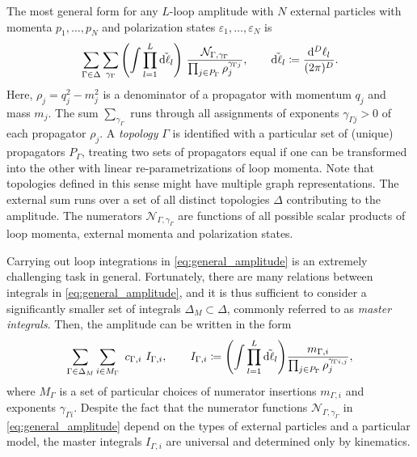 The most general form for any $L$-loop amplitude with $N$ external particles with momenta $p_1,\ldots,p_N$ and polarization states $\varepsilon_1,\ldots,\varepsilon_N$ is
\begin{equation}
  \sum_{\Gamma \in \Delta} \sum_{\gamma_\Gamma} \qty(\int \prod_{l=1}^{L} \tilde{\dd{\ell_l}}) ~ 
  \frac{\mathcal{N}_{\Gamma,\gamma_\Gamma}%
    }{\prod_{j\in P_\Gamma} \rho_j^{\gamma_{\Gamma j}}},
    \qquad \tilde{\dd{\ell_l}} \coloneqq \frac{\dd[D]{\ell_l}}{(2\pi)^{D}}.
  \label{eq:general_amplitude}
\end{equation}
Here, $\rho_j = q_j^2 - m_j^2$ is a denominator of a propagator with momentum $q_j$ and mass $m_j$. The sum $\sum_{\gamma_\Gamma}$ runs through all assignments
of exponents $\gamma_{\Gamma j} > 0$ of each propagator $\rho_j$. 
A \emph{topology} $\Gamma$ is identified with a particular set of (unique) propagators $P_\Gamma$,
treating two sets of propagators equal if one can be transformed into the other with linear re-parametrizations of loop momenta.
Note that topologies defined in this sense might have multiple graph representations.
The external sum runs over a set of all distinct topologies $\Delta$ contributing to the amplitude.
The numerators $\mathcal{N}_{\Gamma,\gamma_\Gamma}$
are functions of all possible scalar products of loop momenta, external momenta and polarization states.

Carrying out loop integrations in \cref{eq:general_amplitude} is an extremely challenging task in general.
Fortunately, there are many relations between integrals in \cref{eq:general_amplitude},
and it is thus sufficient to consider a significantly smaller set of integrals $\Delta_M \subset \Delta$, commonly referred to
as \emph{master integrals}. Then, the amplitude can be written in the form
\begin{equation}
  \sum_{\Gamma \in \Delta_M} \sum_{i\in M_\Gamma} ~ c_{\Gamma,i} ~ I_{\Gamma,i}, 
    \qquad I_{\Gamma,i} \coloneqq 
      \qty(\int \prod_{l=1}^{L} \tilde{\dd{\ell_l}}) \frac{m_{\Gamma,i}}{\prod_{j\in P_\Gamma} \rho_j^{\gamma_{\Gamma i,j}}},
  \label{eq:amplitude_integrated}
\end{equation}
where $M_{\Gamma}$ is a set of particular choices of numerator insertions $m_{\Gamma,i}$ and exponents $\gamma_{\Gamma i}$.
Despite the fact that the numerator functions $\mathcal{N}_{\Gamma,\gamma_\Gamma}$ in \cref{eq:general_amplitude} depend on the types of external particles and a particular model,
the master integrals $I_{\Gamma,i}$ are universal and determined only by kinematics.

